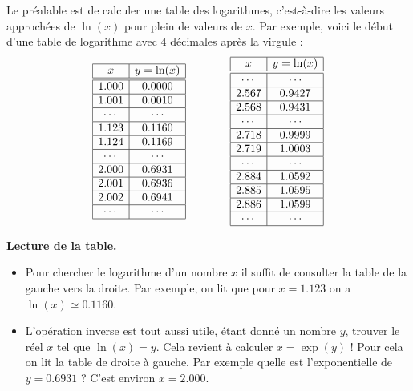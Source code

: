 \documentclass[11pt,class=report,crop=false]{standalone}
\begin{document}
\begin{cours}
Le préalable est de calculer une table des logarithmes, c'est-à-dire 
les valeurs approchées de $\ln(x)$ pour plein de valeurs de $x$.
Par exemple, voici le début d'une table de logarithme avec $4$ décimales après la virgule :
$$\begin{array}{|c|c|}
\hline
x & y=\ln(x) \\ \hline\hline
1.000 & 0.0000 \\ \hline
1.001 & 0.0010 \\ \hline
\cdots & \cdots \\ \hline
1.123 & 0.1160 \\ \hline
1.124 & 0.1169 \\ \hline
\cdots & \cdots \\ \hline
2.000 & 0.6931 \\ \hline
2.001 & 0.6936 \\ \hline 
2.002 & 0.6941 \\ \hline
\cdots & \cdots \\ \hline
\end{array}\qquad\qquad
\begin{array}{|c|c|}
\hline
x & y=\ln(x) \\ \hline\hline
\cdots & \cdots \\ \hline
2.567 & 0.9427 \\ \hline
2.568 & 0.9431 \\ \hline
\cdots & \cdots \\ \hline
2.718 & 0.9999 \\ \hline
2.719 & 1.0003 \\ \hline
\cdots & \cdots \\ \hline
2.884 & 1.0592  \\ \hline
2.885 & 1.0595  \\ \hline
2.886 & 1.0599  \\ \hline
\cdots & \cdots \\ \hline
\end{array}$$
 
 
\bigskip

\textbf{Lecture de la table.}

 \begin{itemize}
  \item Pour chercher le logarithme d'un nombre $x$ il suffit de consulter la table de la gauche vers la droite. Par exemple, on lit que pour $x=1.123$ on a $\ln(x) \simeq 0.1160$.
  
  \item L'opération inverse est tout aussi utile, étant donné un nombre $y$, trouver le réel $x$ tel que $\ln(x)=y$. Cela revient
à calculer $x = \exp(y)$ ! Pour cela on lit la table de droite à gauche. Par exemple quelle est l'exponentielle de $y=0.6931$ ? C'est environ $x=2.000$.
   

\end{itemize}
\end{cours}
\end{document}
